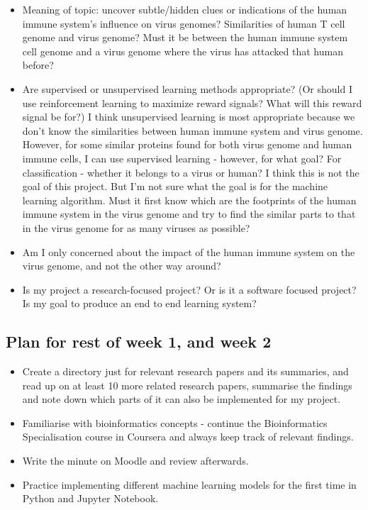 \documentclass[11pt]{article}
\begin{document}
\begin{itemize}
    \tightlist
\item Meaning of topic: uncover subtle/hidden clues or indications of the human immune system's influence on virus genomes? Similarities of human T cell genome and virus genome? Must it be between the human immune system cell genome and a virus genome where the virus has attacked that human before?
\item Are supervised or unsupervised learning methods appropriate? (Or should I use reinforcement learning to maximize reward signals? What will this reward signal be for?) I think unsupervised learning is most appropriate because we don’t know the similarities between human immune system and virus genome. However, for some similar proteins found for both virus genome and human immune cells, I can use supervised learning - however, for what goal? For classification - whether it belongs to a virus or human? I think this is not the goal of this project. But I’m not sure what the goal is for the machine learning algorithm. Must it first know which are the footprints of the human immune system in the virus genome and try to find the similar parts to that in the virus genome for as many viruses as possible?
\item Am I only concerned about the impact of the human immune system on the virus genome, and not the other way around?
\item Is my project a research-focused project? Or is it a software focused project? Is my goal to produce an end to end learning system?
\end{itemize}

\subsection{Plan for rest of week 1, and week 2}\label{plan}

\begin{itemize}
    \tightlist
\item Create a directory just for relevant research papers and its summaries, and read up on at least 10 more related research papers, summarise the findings and note down which parts of it can also be implemented for my project.
\item Familiarise with bioinformatics concepts - continue the Bioinformatics Specialisation course in Coursera and always keep track of relevant findings.
\item Write the minute on Moodle and review afterwards.
\item Practice implementing different machine learning models for the first time in Python and Jupyter Notebook.
\end{itemize}
\end{document}
